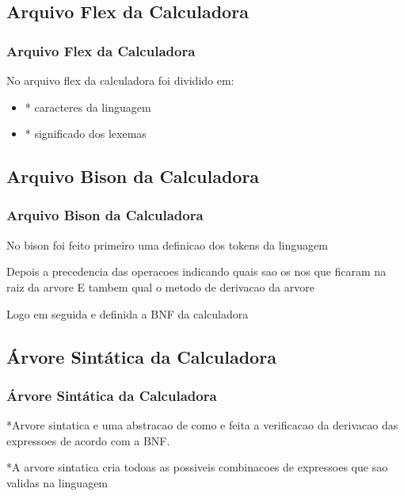 \documentclass{beamer}
\begin{document}
\subsection{Arquivo Flex da Calculadora}

\begin{frame}
\frametitle{Arquivo Flex da Calculadora}
	No arquivo flex da calculadora foi dividido em:
	\begin{itemize}
	\item<1-> * caracteres da linguagem
	\item<2-> * significado dos lexemas 
	\end{itemize}
\end{frame}

\subsection{Arquivo Bison da Calculadora}
	
\begin{frame}
\frametitle{Arquivo Bison da Calculadora}
	No bison foi feito primeiro uma definicao dos tokens da linguagem 
	
	Depois a precedencia das operacoes indicando quais sao os nos que ficaram na raiz da arvore
	E tambem qual o metodo de derivacao da arvore
	
	Logo em seguida e definida a BNF da calculadora
\end{frame}

\subsection{Árvore Sintática da Calculadora }
\begin{frame}
\frametitle{Árvore Sintática da Calculadora }
	*Arvore sintatica e uma abstracao de como e feita a verificacao da derivacao das expressoes de acordo com a BNF.
	
	*A arvore sintatica cria todoas as possiveis combinacoes de expressoes que sao validas na linguagem
	
\end{frame}
\end{document}
